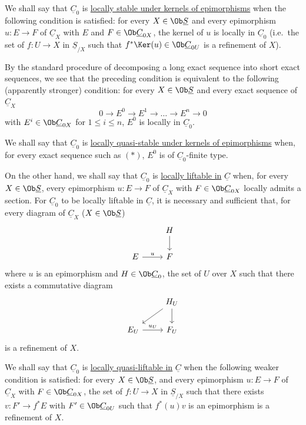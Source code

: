 %
We shall say that \(\underline{C}_0\) is \uline{locally stable under kernels of epimorphisms} when the following condition is satisfied: for every \(X\in\Ob \underline{S}\) and every epimorphism \(u:E\longrightarrow F\) of \(\underline{C}_X\) with \(E\) and \(F\in\Ob\underline{C}_{0X}\), the kernel of \(u\) is locally in \(\underline{C}_0\) (i.e.\ the set of \(f:U\to X\) in \(\underline{S}_{/X}\) such that \(f^*\Ker(u)\in\Ob\underline{C}_{0U}\) is a refinement of \(X\)).

By the standard procedure of decomposing a long exact sequence into short exact sequences, we see that the preceding condition is equivalent to the following (apparently stronger) condition: for every \(X\in\Ob \underline{S}\) and every exact sequence of \(\underline{C}_X\)
\begin{equation}\tag{*}
  0\longrightarrow E^0\longrightarrow E^1\longrightarrow\ldots\longrightarrow E^n\longrightarrow 0
\end{equation}
with \(E^i\in\Ob\underline{C}_{0X}\) for \(1\leq i\leq n\), \(E^0\) is locally in \(\underline{C}_0\).

We shall say that \(\underline{C}_0\) is \uline{locally quasi-stable under kernels of epimorphisms} when, for every exact sequence such as \((*)\), \(E^0\) is of \(\underline{C}_0\)-finite type.

On the other hand, we shall say that \(\underline{C}_0\) is \uline{locally liftable in} \(\underline{C}\) when, for every \(X\in\Ob \underline{S}\), every epimorphism \(u:E\longrightarrow F\) of \(\underline{C}_X\) with \(F\in\Ob\underline{C}_{0X}\) locally admits a section. For \(\underline{C}_0\) to be locally liftable in \(\underline{C}\), it is necessary and sufficient that, for every diagram of \(\underline{C}_X\) (\(X\in\Ob \underline{S}\))
\[
\begin{tikzcd}
& H \arrow[d]\\
E \arrow[r,"u"] & F
\end{tikzcd}
\]
where \(u\) is an epimorphism and \(H\in\Ob\underline{C}_0\), the set of \(U\) over \(X\) such that there exists a commutative diagram
\[
\begin{tikzcd}
& H_U \arrow[d] \arrow[dl]\\
E_U \arrow[r,"u_U"] & F_U
\end{tikzcd}
\]
is a refinement of \(X\).

%
We shall say that \(\underline{C}_0\) is \uline{locally quasi-liftable in} \(\underline{C}\) when the following weaker condition is satisfied: for every \(X\in\Ob \underline{S}\), and every epimorphism \(u:E\longrightarrow F\) of \(\underline{C}_X\) with \(F\in\Ob\underline{C}_{0X}\), the set of \(f:U\to X\) in \(\underline{S}_{/X}\) such that there exists \(v:F'\longrightarrow f^*E\) with \(F'\in\Ob\underline{C}_{0U}\) such that \(f^*(u)v\) is an epimorphism is a refinement of \(X\).

